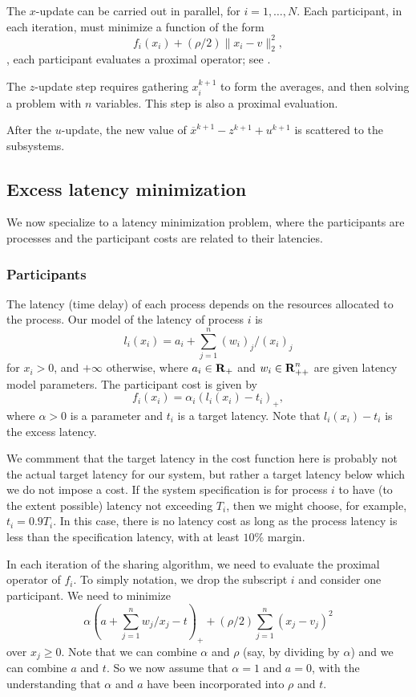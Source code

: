 The $x$-update can be carried out in parallel, for $i=1, \ldots, N$.
Each participant, in each iteration, must minimize a function of the form
\[
f_i(x_i) + (\rho/2) \|x_i - v\|_2^2,
\]
\ie, each participant evaluates a proximal operator; see
\cite{ProxAlgs}.

The $z$-update step requires
gathering $x_i^{k+1}$ to form the averages, and then solving a problem
with $n$ variables.  This step is also a proximal evaluation.

After the $u$-update, the new value of $\overline x^{k+1}-
z^{k+1}+u^{k+1}$ is scattered to the subsystems.

\subsection{Excess latency minimization}

We now specialize to a latency minimization problem,
where the participants are processes and the participant costs 
are related to their latencies.

\subsubsection{Participants}

The latency (time delay) of each process depends on the 
resources allocated to the process.
Our model of the latency of process $i$ is
\[
l_i(x_i) = a_i + \sum_{j=1}^n (w_i)_j/(x_i)_j
\]
for $x_i >0$, and $+\infty$ otherwise, where $a_i \in {\mbox{\textbf{R}}}_+$ and 
$w_i \in {\mbox{\textbf{R}}}_{++}^n$ are given latency model parameters.
The participant cost is given by
\[
f_i(x_i) = \alpha_i (l_i(x_i) - t_i)_+,
\]
where $\alpha >0$ is a parameter and $t_i$ is a target latency.
Note that $l_i(x_i)-t_i$ is the excess latency.

We commment that the target latency in the cost function here is
probably not the actual target latency for our system, but rather
a target latency below which we do not impose a cost.  If the system
specification is for process $i$ to have (to the extent possible) latency
not exceeding $T_i$, then we might choose, for example, $t_i= 0.9T_i$.
In this case, there is no latency cost as long as the process latency is
less than the specification latency, with at least $10\%$ margin.

In each iteration of the sharing algorithm, 
we need to evaluate the proximal operator of $f_i$.
To simply notation, we drop the subscript $i$ and consider one
participant.
We need to minimize
\[
\alpha \left(a + \sum_{j=1}^n w_j/x_j - t\right)_+ + 
(\rho/2)\sum_{j=1}^n (x_j - v_j)^2
\]
over $x_j\geq 0$.
Note that we can combine $\alpha$ and $\rho$ (say, by dividing by 
$\alpha$) and we can combine $a$ and $t$.  So we now 
assume that $\alpha =1$ and $a=0$, with the understanding that
$\alpha$ and $a$ have been incorporated into $\rho$ and $t$.


